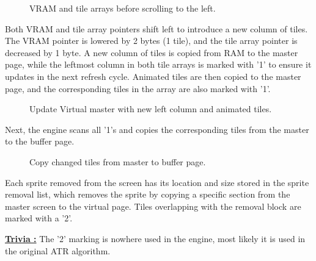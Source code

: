 \documentclass[book.tex]{subfiles}
\begin{document}
\begin{figure}[H]
\centering
 \caption{VRAM and tile arrays before scrolling to the left.}
 \label{fig:kc4_6_step0}
\end{figure}

\pagebreak
Both VRAM and tile array pointers shift left to introduce a new column of tiles. The VRAM pointer is lowered by 2 bytes (1 tile), and the tile array pointer is decreased by 1 byte.
A new column of tiles is copied from RAM to the master page, while the leftmost column in both tile arrays is marked with '1' to ensure it updates in the next refresh cycle. Animated tiles are then copied to the master page, and the corresponding tiles in the array are also marked with '1'.\\

\begin{figure}[H]
\centering
 \caption{Update Virtual master with new left column and animated tiles.}
 \label{fig:kc4_6_step1}
\end{figure}

\pagebreak
Next, the engine scans all '1's and copies the corresponding tiles from the master to the buffer page. \\


\begin{figure}[H]
\centering
 \caption{Copy changed tiles from master to buffer page.}
 \label{fig:kc4_6_step2}
\end{figure}

\pagebreak
Each sprite removed from the screen has its location and size stored in the sprite removal list, which removes the sprite by copying a specific section from the master screen to the virtual page. Tiles overlapping with the removal block are marked with a '2'.\\

\par
\textbf{\underline{Trivia :}} The '2' marking is nowhere used in the engine, most likely it is used in the original ATR algorithm.\\


\par
\begin{minipage}{\textwidth}
  
  \end{minipage}
  \label{block_removal}
\\
\par
\begin{minipage}{\textwidth}
  
  \end{minipage}
  \label{block_removal}
\end{document}
